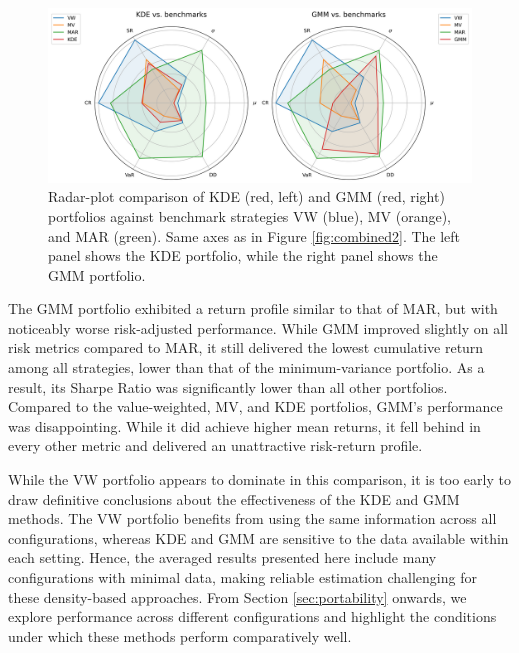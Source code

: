 \begin{figure}[H]
\begin{center}
\begin{minipage}{1\textwidth}
  \centering
  \includegraphics[width=\textwidth]{images/40_3.png}
\end{minipage}
\caption[Benchmark vs. KDE/GMM performance - Radar]{Radar-plot comparison of KDE (red, left) and GMM (red, right) portfolios against benchmark strategies VW (blue), MV (orange), and MAR (green). Same axes as in Figure \ref{fig:combined2}. The left panel shows the KDE portfolio, while the right panel shows the GMM portfolio.}
\label{fig:combined3}
\end{center}
\end{figure}

The GMM portfolio exhibited a return profile similar to that of MAR, but with noticeably worse risk-adjusted performance. While GMM improved slightly on all risk metrics compared to MAR, it still delivered the lowest cumulative return among all strategies, lower than that of the minimum-variance portfolio. As a result, its Sharpe Ratio was significantly lower than all other portfolios. Compared to the value-weighted, MV, and KDE portfolios, GMM's performance was disappointing. While it did achieve higher mean returns, it fell behind in every other metric and delivered an unattractive risk-return profile.

While the VW portfolio appears to dominate in this comparison, it is too early to draw definitive conclusions about the effectiveness of the KDE and GMM methods. The VW portfolio benefits from using the same information across all configurations, whereas KDE and GMM are sensitive to the data available within each setting. Hence, the averaged results presented here include many configurations with minimal data, making reliable estimation challenging for these density-based approaches. From Section \ref{sec:portability} onwards, we explore performance across different configurations and highlight the conditions under which these methods perform comparatively well.


